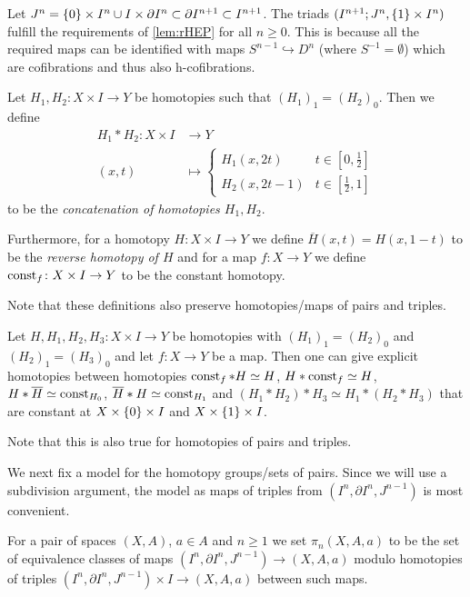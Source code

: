 \begin{remark}\label{rmk:cwInclIsHCofib}
    Let $J^n=\left\lbrace0\right\rbrace\times I^n\cup I\times\partial I^n\subset\partial I^{n+1}\subset I^{n+1}$.
    The triads $(I^{n+1};J^n,\left\lbrace1\right\rbrace\times I^n)$ fulfill the requirements of \cref{lem:rHEP} for all $n\geq 0$.
    This is because all the required maps can be identified with maps $S^{n-1}\hookrightarrow D^n$ (where $S^{-1}=\emptyset$) which are cofibrations and thus also h-cofibrations.
\end{remark}
\begin{definition}
    Let $H_1,H_2\colon X\times I\to Y$ be homotopies such that $(H_1)_1=(H_2)_0$.
    Then we define 
    \begin{align*}
        H_1*H_2\colon X\times I&\to Y\\
        (x,t)&\mapsto\begin{cases}
            H_1(x,2t) & t\in[0,\frac{1}{2}]\\
            H_2(x,2t-1) & t\in[\frac{1}{2},1]
        \end{cases}
    \end{align*}
    to be the \emph{concatenation of homotopies $H_1, H_2$}.

    Furthermore, for a homotopy $H\colon X\times I\to Y$ we define $\overline{H}(x,t)=H(x,1-t)$ to be the \emph{reverse homotopy of $H$} and for a map $f\colon X\to Y$ we define $\operatorname{const}_f\colon X\times I\to Y$ to be the constant homotopy.
    
    Note that these definitions also preserve homotopies/maps of pairs and triples.
\end{definition}
\begin{remark}\label{rmk:choiceOfConstantHtpy}
    Let $H,H_1,H_2,H_3\colon X\times I\to Y$ be homotopies with $(H_1)_1=(H_2)_0$ and $(H_2)_1=(H_3)_0$ and let $f\colon X\to Y$ be a map.
    Then one can give explicit homotopies between homotopies $\operatorname{const}_f*H\simeq H$, $H*\operatorname{const}_f\simeq H$, $H*\overline{H}\simeq \operatorname{const}_{H_0}$, $\overline{H}*H\simeq\operatorname{const}_{H_1}$ and $(H_1*H_2)*H_3\simeq H_1*(H_2*H_3)$ that are constant at $X\times\left\lbrace0\right\rbrace\times I$ and $X\times\left\lbrace1\right\rbrace\times I$.

    Note that this is also true for homotopies of pairs and triples.
\end{remark}
We next fix a model for the homotopy groups/sets of pairs.
Since we will use a subdivision argument, the model as maps of triples from $(I^n,\partial I^n,J^{n-1})$ is most convenient.
\begin{definition}
    For a pair of spaces $(X,A)$, $a\in A$ and $n\geq 1$ we set $\pi_n(X,A,a)$ to be the set of equivalence classes of maps $(I^n,\partial I^n,J^{n-1})\to(X,A,a)$ modulo homotopies of triples $(I^n,\partial I^n,J^{n-1})\times I\to(X,A,a)$ between such maps.
\end{definition}
